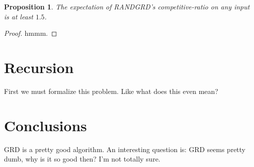 \documentclass[twocolumn]{article}[10pt]
\newtheorem{proposition}{Proposition}
\begin{document}
\begin{proposition}
  The expectation of RANDGRD's competitive-ratio on any input
  is at least $1.5$.
\end{proposition}
\begin{proof}
 hmmm. 
\end{proof}


\section{Recursion}
First we must formalize this problem. Like what does
this even mean?

\section{Conclusions}
GRD is a pretty good algorithm. 
An interesting question is: GRD seems pretty dumb, why is it
so good then? I'm not totally sure.



\end{document}

